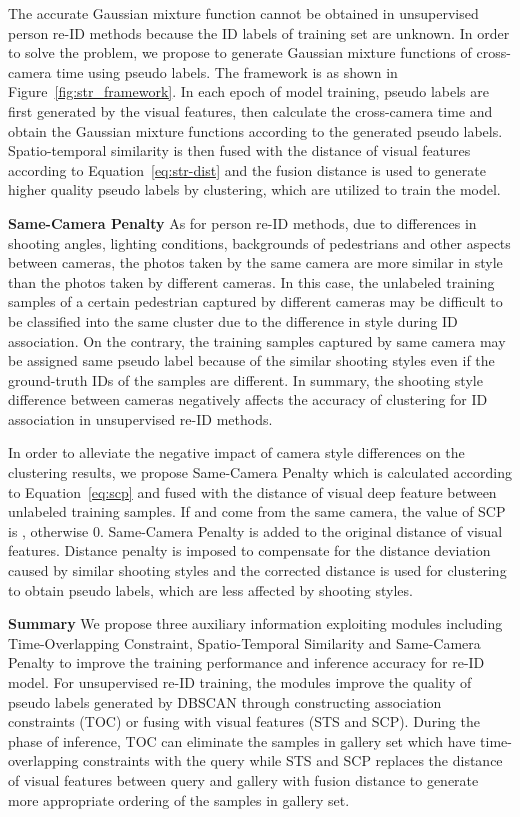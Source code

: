 \documentclass[10pt,twocolumn,letterpaper]{article}
\begin{document}
The accurate Gaussian mixture function  cannot be obtained in unsupervised person re-ID methods because the ID labels of training set are unknown. In order to solve the problem, we propose to generate Gaussian mixture functions of cross-camera time using pseudo labels. The framework is as shown in Figure~\ref{fig:str_framework}. In each epoch of model training, pseudo labels are first generated by the visual features, then calculate the cross-camera time and obtain the Gaussian mixture functions according to the generated pseudo labels. Spatio-temporal similarity is then fused with the distance of visual features according to Equation~\ref{eq:str-dist} and the fusion distance is used to generate higher quality pseudo labels by clustering, which are utilized to train the model.

\noindent \textbf{Same-Camera Penalty}
As for person re-ID methods, due to differences in shooting angles, lighting conditions, backgrounds of pedestrians and other aspects between cameras, the photos taken by the same camera are more similar in style than the photos taken by different cameras. In this case, the unlabeled training samples of a certain pedestrian captured by different cameras may be difficult to be classified into the same cluster due to the difference in style during ID association. On the contrary, the training samples captured by same camera may be assigned same pseudo label because of the similar shooting styles even if the ground-truth IDs of the samples are different. In summary, the shooting style difference between cameras negatively affects the accuracy of clustering for ID association in unsupervised re-ID methods.

In order to alleviate the negative impact of camera style differences on the clustering results, we propose Same-Camera Penalty which is calculated according to Equation~\ref{eq:scp} and fused with the distance of visual deep feature between unlabeled training samples. If  and  come from the same camera, the value of SCP is , otherwise 0. Same-Camera Penalty is added to the original distance of visual features. Distance penalty  is imposed to compensate for the distance deviation caused by similar shooting styles and the corrected distance is used for clustering to obtain pseudo labels, which are less affected by shooting styles.



\noindent \textbf{Summary}
We propose three auxiliary information exploiting modules including Time-Overlapping Constraint, Spatio-Temporal Similarity and Same-Camera Penalty to improve the training performance and inference accuracy for re-ID model. For unsupervised re-ID training, the modules improve the quality of pseudo labels generated by DBSCAN through constructing association constraints (TOC) or fusing with visual features (STS and SCP). During the phase of inference, TOC can eliminate the samples in gallery set which have time-overlapping constraints with the query while STS and SCP replaces the distance of visual features between query and gallery with fusion distance to generate more appropriate ordering of the samples in gallery set.
\end{document}
